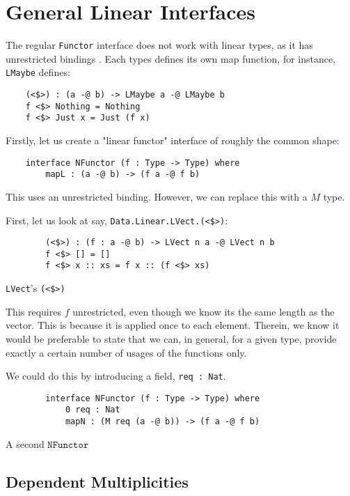 \section{General Linear Interfaces}

The regular \verb|Functor| interface does not work with linear types, as it has unrestricted bindings \cite{eb_idris_qtt_prac}.
Each types defines its own map function, for instance, \verb|LMaybe| defines: 

\begin{verbatim}
	(<$>) : (a -@ b) -> LMaybe a -@ LMaybe b
	f <$> Nothing = Nothing
	f <$> Just x = Just (f x)
\end{verbatim}

Firstly, let us create a "linear functor" interface of roughly the common shape:

\begin{verbatim}
	interface NFunctor (f : Type -> Type) where 
		mapL : (a -@ b) -> (f a -@ f b)
\end{verbatim}

This uses an unrestricted binding. 
However, we can replace this with a $M$ type.

First, let us look at say, \verb|Data.Linear.LVect.(<$>)|:

\begin{listing}
	\begin{verbatim}
		(<$>) : (f : a -@ b) -> LVect n a -@ LVect n b
		f <$> [] = []
		f <$> x :: xs = f x :: (f <$> xs)
	\end{verbatim}
	\caption{\texttt{LVect}'s \texttt{(<\$>)}}
\end{listing}


This requires $f$ unrestricted, even though we know its the same length as the vector.
This is because it is applied once to each element.
Therein, we know it would be preferable to state that we can, in general, for a given type, provide exactly a certain number of usages of the functions only.

We could do this by introducing a field, \verb|req : Nat|.
\begin{listing}
	\begin{verbatim}
		interface NFunctor (f : Type -> Type) where 
			0 req : Nat
			mapN : (M req (a -@ b)) -> (f a -@ f b)
	\end{verbatim}
	\caption{A second $\texttt{NFunctor}$}
\end{listing}

\subsection{Dependent Multiplicities}

